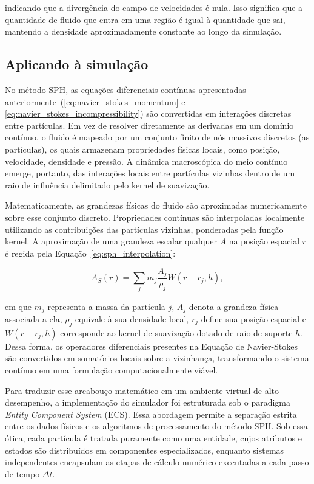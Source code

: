 indicando que a divergência do campo de velocidades é nula. Isso significa que
a quantidade de fluido que entra em uma região é igual à quantidade que sai,
mantendo a densidade aproximadamente constante ao longo da simulação.

\subsection{Aplicando à simulação}
\label{subsec:aplicando-a-simulacao}

No método SPH, as equações diferenciais contínuas apresentadas
anteriormente~(\ref{eq:navier_stokes_momentum} e
\ref{eq:navier_stokes_incompressibility}) são convertidas em interações
discretas entre partículas. Em vez de resolver diretamente as derivadas em um
domínio contínuo, o fluido é mapeado por um conjunto finito de nós massivos
discretos (as partículas), os quais armazenam propriedades físicas locais, como
posição, velocidade, densidade e pressão. A dinâmica macroscópica do meio
contínuo emerge, portanto, das interações locais entre partículas vizinhas
dentro de um raio de influência delimitado pelo kernel de suavização.

Matematicamente, as grandezas físicas do fluido são aproximadas numericamente
sobre esse conjunto discreto. Propriedades contínuas são interpoladas
localmente utilizando as contribuições das partículas vizinhas, ponderadas pela
função kernel. A aproximação de uma grandeza escalar qualquer $A$ na posição
espacial $r$ é regida pela Equação~\ref{eq:sph_interpolation}:

\begin{equation}
A_S(r) = \sum_j m_j \frac{A_j}{\rho_j} W(r-r_j,h),
\label{eq:sph_interpolation}
\end{equation}

em que $m_j$ representa a massa da partícula $j$, $A_j$ denota a
grandeza física associada a ela, $\rho_j$ equivale à sua densidade local, $r_j$
define sua posição espacial e $W(r-r_j,h)$ corresponde ao kernel de suavização
dotado de raio de suporte $h$. Dessa forma, os operadores diferenciais
presentes na Equação de Navier-Stokes são convertidos em somatórios locais
sobre a vizinhança, transformando o sistema contínuo em uma formulação
computacionalmente viável.

Para traduzir esse arcabouço matemático em um ambiente virtual de alto
desempenho, a implementação do simulador foi estruturada sob o paradigma
\textit{Entity Component System} (ECS). Essa abordagem permite a separação
estrita entre os dados físicos e os algoritmos de processamento do método SPH.
Sob essa ótica, cada partícula é tratada puramente como uma entidade, cujos
atributos e estados são distribuídos em componentes especializados, enquanto
sistemas independentes encapsulam as etapas de cálculo numérico executadas a
cada passo de tempo $\Delta t$.

